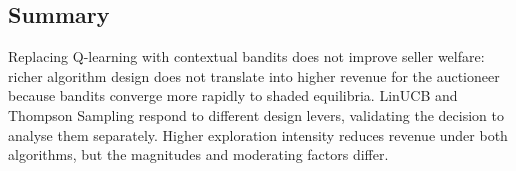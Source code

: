 \subsection{Summary}

Replacing Q-learning with contextual bandits does not improve seller welfare: richer algorithm design does not translate into higher revenue for the auctioneer because bandits converge more rapidly to shaded equilibria. LinUCB and Thompson Sampling respond to different design levers, validating the decision to analyse them separately. Higher exploration intensity reduces revenue under both algorithms, but the magnitudes and moderating factors differ.
